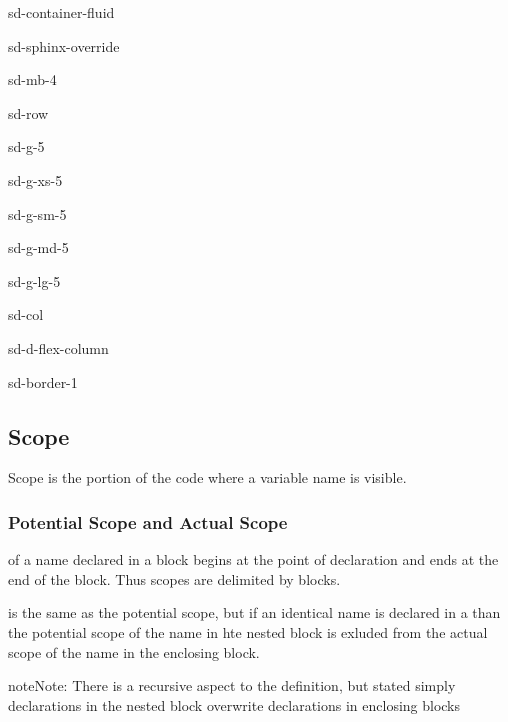 \documentclass[a4paper,10pt,english]{jupyterBook}
\begin{document}
\begin{sphinxuseclass}{sd-container-fluid}
\begin{sphinxuseclass}{sd-sphinx-override}
\begin{sphinxuseclass}{sd-mb-4}
\begin{sphinxuseclass}{sd-row}
\begin{sphinxuseclass}{sd-g-5}
\begin{sphinxuseclass}{sd-g-xs-5}
\begin{sphinxuseclass}{sd-g-sm-5}
\begin{sphinxuseclass}{sd-g-md-5}
\begin{sphinxuseclass}{sd-g-lg-5}
\begin{sphinxuseclass}{sd-col}
\begin{sphinxuseclass}{sd-d-flex-column}
\begin{sphinxuseclass}{sd-border-1}
\end{sphinxuseclass}
\end{sphinxuseclass}
\end{sphinxuseclass}
\end{sphinxuseclass}
\end{sphinxuseclass}
\end{sphinxuseclass}
\end{sphinxuseclass}
\end{sphinxuseclass}
\end{sphinxuseclass}
\end{sphinxuseclass}
\end{sphinxuseclass}
\end{sphinxuseclass}

\subsection{Scope}
\label{\detokenize{text/progtut/blocks:scope}}
\sphinxAtStartPar
Scope is the portion of the code where a variable name is visible.


\subsubsection{Potential Scope and Actual Scope}
\label{\detokenize{text/progtut/blocks:potential-scope-and-actual-scope}}
\sphinxAtStartPar
{} of a name declared in a block begins at the point of declaration and ends at the end of the block. Thus scopes are delimited by blocks.

\sphinxAtStartPar
{} is the same as the potential scope, but if an identical name is declared in a  than the potential scope of the name in hte nested block is exluded from the actual scope of the name in the enclosing block.

\begin{sphinxadmonition}{note}{Note:}
\sphinxAtStartPar
There is a recursive aspect to the definition, but stated simply declarations in the nested block overwrite declarations in enclosing blocks
\end{sphinxadmonition}
\end{document}
